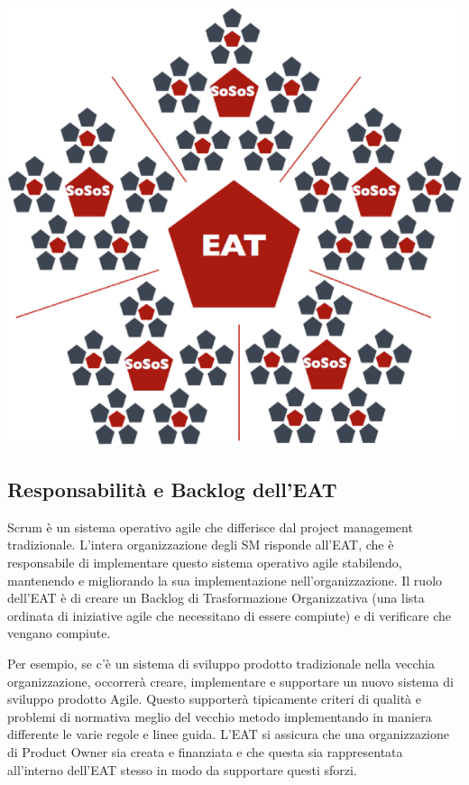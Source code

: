 \documentclass[12pt,a4paper,parskip=full]{scrartcl}
\begin{document}
\includegraphics[width=\textwidth,height=\textheight,keepaspectratio]{SoS-EAT.png}

\subsection{Responsabilità e Backlog dell'EAT}
Scrum è un sistema operativo agile che differisce dal project management tradizionale.
L'intera organizzazione degli SM risponde all'EAT, che è responsabile di implementare questo sistema operativo agile stabilendo, mantenendo e migliorando la sua implementazione nell'organizzazione. Il ruolo dell'EAT è di creare un Backlog di Trasformazione Organizzativa (una lista ordinata di iniziative agile che necessitano di essere compiute) e di verificare che vengano compiute.

Per esempio, se c'è un sistema di sviluppo prodotto tradizionale nella vecchia organizzazione, occorrerà creare, implementare e supportare un nuovo sistema di sviluppo prodotto Agile. Questo supporterà tipicamente criteri di qualità e problemi di normativa meglio del vecchio metodo implementando in maniera differente le varie regole e linee guida. L'EAT si assicura che una organizzazione di Product Owner sia creata e finanziata e che questa sia rappresentata all'interno dell'EAT stesso in modo da supportare questi sforzi.
\end{document}
